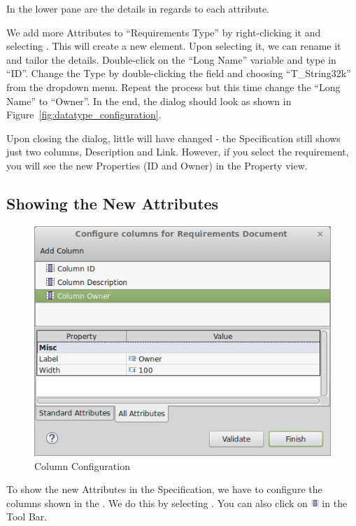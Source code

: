 In the lower pane are the details in regards to each attribute.

We add more Attributes to ``Requirements Type'' by right-clicking it and selecting .  This will create a new element.  Upon selecting it, we can rename it and tailor the details.  Double-click on the ``Long Name'' variable and type in ``ID''.  Change the Type by double-clicking the field and choosing ``T\_String32k'' from the dropdown menu.  Repeat the process but this time change the ``Long Name'' to ``Owner''.  In the end, the dialog should look as shown in Figure~\ref{fig:datatype_configuration}.

Upon closing the dialog, little will have changed - the Specification still shows just two columns, Description and Link.  However, if you select the requirement, you will see the new Properties (ID and Owner) in the Property view.

\subsection{Showing the New Attributes}
\label{sec:show-new-attributes}

\begin{figure}
\centering      
\includegraphics[width=0.8\linewidth]{../rmf-images/columnconfig.png}      
\caption{Column Configuration}
\label{fig:column_configuration}
\end{figure}

To show the new Attributes in the Specification, we have to configure the columns shown in the .  We do this by selecting .  You can also click on \includegraphics[height=0.8em]{../rmf-images/icons/full/obj16/Column.png} in the Tool Bar.

